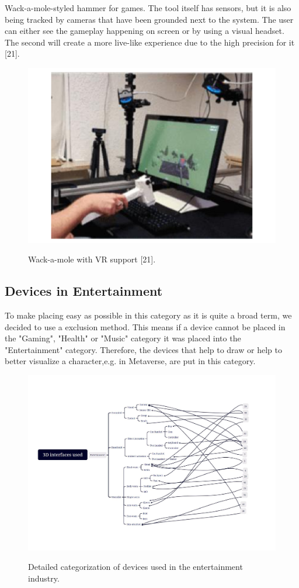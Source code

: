 Wack-a-mole-styled hammer for games. The tool itself has sensors, but it is also being tracked by cameras that have been grounded next to the system. The user can either see the gameplay happening on screen or by using a visual headset. The second will create a more live-like experience due to the high precision for it [21].

\begin{figure}[htbp]
	\includegraphics[width=\linewidth]{figures/whack.pdf}
	\label{fig:wack}
	\caption{Wack-a-mole with VR support [21].}
\end{figure}


\subsection{Devices in Entertainment}
\label{entertainment}
To make placing easy as possible in this category as it is quite a broad term, we decided to use a exclusion method. This means if a device cannot be placed in the "Gaming", "Health" or "Music" category it was placed into the "Entertainment" category. Therefore, the devices that help to draw or help to better visualize a character,e.g. in Metaverse, are put in this category.


\begin{figure}[htbp]
	\includegraphics[width=\linewidth]{figures/entertainment.pdf}
	\label{fig:entertainment}
	\caption{Detailed categorization of devices used in the entertainment industry.}
\end{figure}



